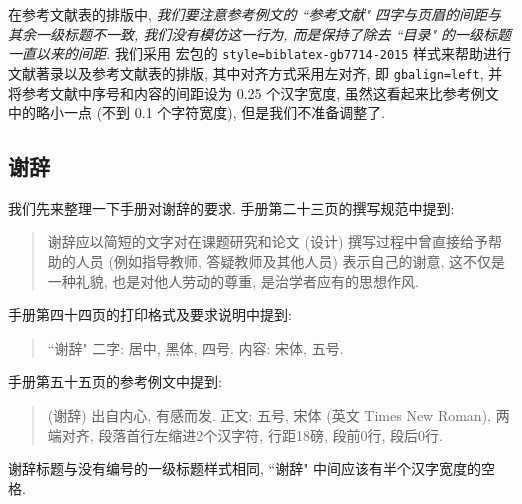 在参考文献表的排版中, \emph{我们要注意参考例文的 ``参考文献" 四字与页眉的间距与其余一级标题不一致, 我们没有模仿这一行为, 而是保持了除去 ``目录" 的一级标题一直以来的间距.} 我们采用  宏包的 \verb|style=biblatex-gb7714-2015| 样式来帮助进行文献著录以及参考文献表的排版, 其中对齐方式采用左对齐, 即 \verb|gbalign=left|, 并将参考文献中序号和内容的间距设为 0.25 个汉字宽度, 虽然这看起来比参考例文中的略小一点 (不到 0.1 个字符宽度), 但是我们不准备调整了.

\subsection{谢辞}

我们先来整理一下手册对谢辞的要求. 手册第二十三页的撰写规范中提到:
\begin{quote}
  谢辞应以简短的文字对在课题研究和论文 (设计) 撰写过程中曾直接给予帮助的人员 (例如指导教师, 答疑教师及其他人员) 表示自己的谢意, 这不仅是一种礼貌, 也是对他人劳动的尊重, 是治学者应有的思想作风.
\end{quote}
手册第四十四页的打印格式及要求说明中提到:
\begin{quote}
  ``谢辞" 二字: 居中, 黑体, 四号.
  内容: 宋体, 五号.
\end{quote}
手册第五十五页的参考例文中提到:
\begin{quote}
  (谢辞) 出自内心, 有感而发. 正文: 五号, 宋体 (英文 Times New Roman), 两端对齐, 段落首行左缩进2个汉字符, 行距18磅, 段前0行, 段后0行.
\end{quote}

谢辞标题与没有编号的一级标题样式相同, ``谢辞" 中间应该有半个汉字宽度的空格.
